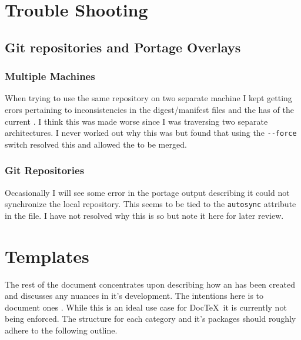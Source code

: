 \documentclass{article}
\begin{document}
\section{Trouble Shooting}

\subsection{Git repositories and Portage Overlays} \label{ssec:issues:git}

\subsubsection{Multiple Machines}

When trying to use the same repository on two separate machine I kept getting erors pertaining to inconsistencies in the digest/manifest files and the has of the current .
I think this was made worse since I was traversing two separate architectures.
I never worked out why this was but found that using the \lstinline|--force| switch resolved this and allowed the  to be merged.

\subsubsection{Git Repositories}

Occasionally I will see some error in the portage output describing it could not synchronize the local repository.
This seems to be tied to the \lstinline|autosync| attribute in the  file.
I have not resolved why this is so but note it here for later review.

\section{Templates}

The rest of the document concentrates upon describing how an \eBuild has been created and discusses any nuances in it's development.
The intentions here is to document ones . 
While this is an ideal use case for Doc\TeX\ it is currently not being enforced.
The structure for each category and it's packages should roughly adhere to the following outline.
\end{document}
